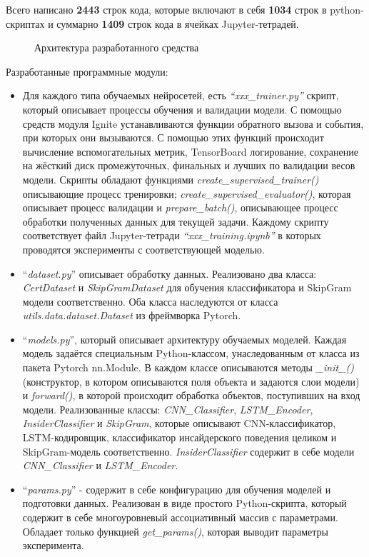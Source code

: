 Всего написано \textbf{2443} строк кода, которые включают в себя \textbf{1034} строк в python-скриптах и суммарно \textbf{1409} строк кода в ячейках Jupyter-тетрадей.\\

\begin{figure}[ht]
	\noindent{}
	\caption{Архитектура разработанного средства}
	\label{fig:architecture}
\end{figure}

Разработанные программные модули:
\begin{itemize}
\item Для каждого типа обучаемых нейросетей, есть \textit{``xxx\_trainer.py''} скрипт, который описывает процессы обучения и валидации модели. С помощью средств модуля Ignite устанавливаются функции обратного вызова и события, при которых они вызываются. С помощью этих функций происходит вычисление вспомогательных метрик, TensorBoard логирование, сохранение на жёсткий диск промежуточных, финальных и лучших по валидации весов модели. Скрипты обладают функциями \textit{create\_supervised\_trainer()} описывающие процесс тренировки; \textit{create\_supervised\_evaluator()}, которая описывает процесс валидации и \textit{prepare\_batch()}, описывающее процесс обработки полученных данных для текущей задачи. Каждому скрипту соответствует файл Jupyter-тетради \textit{``xxx\_training.ipynb''} в которых проводятся эксперименты с соответствующей моделью.
\item{``\textit{dataset.py}''} описывает обработку данных. Реализовано два класса: \textit{CertDataset} и \textit{SkipGramDataset} для обучения классификатора и SkipGram модели соответственно. Оба класса наследуются от класса \textit{utils.data.dataset.Dataset} из фреймворка Pytorch.
\item ``\textit{models.py}'', который описывает архитектуру обучаемых моделей. Каждая модель задаётся специальным Python-классом, унаследованным от класса из пакета Pytorch nn.Module. В каждом классе описываются методы \textit{\_init\_()} (конструктор, в котором описываются поля объекта и задаются слои модели) и \textit{forward()}, в которой происходит обработка объектов, поступивших на вход модели. Реализованные классы: \textit{CNN\_Classifier}, \textit{LSTM\_Encoder}, \textit{InsiderClassifier} и \textit{SkipGram}, которые описывают CNN-классификатор, LSTM-кодировщик, классификатор инсайдерского поведения целиком и SkipGram-модель соответственно. \textit{InsiderClassifier} содержит в себе модели \textit{CNN\_Classifier} и \textit{LSTM\_Encoder}.
\item ``\textit{params.py}'' - содержит в себе конфигурацию для обучения моделей и подготовки данных. Реализован в виде простого Python-скрипта, который содержит в себе многоуровневый ассоциативный массив с параметрами. Обладает только функцией \textit{get\_params()}, которая выводит параметры эксперимента.
\end{itemize}
